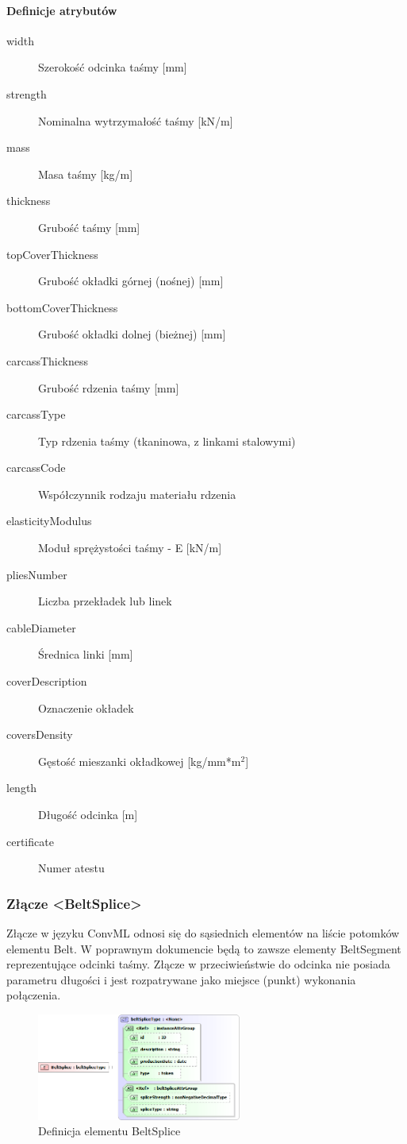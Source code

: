 \documentclass[12pt,a4paper]{article}
\begin{document}
\paragraph{Definicje atrybutów}
\begin{description}
\item[width] Szerokość odcinka taśmy [mm]
\item[strength] Nominalna wytrzymałość taśmy [kN/m]
\item[mass] Masa taśmy [kg/m]
\item[thickness] Grubość taśmy [mm]
\item[topCoverThickness] Grubość okładki górnej (nośnej) [mm]
\item[bottomCoverThickness] Grubość okładki dolnej (bieżnej) [mm]
\item[carcassThickness] Grubość rdzenia taśmy [mm]
\item[carcassType] Typ rdzenia taśmy (tkaninowa, z linkami stalowymi)
\item[carcassCode] Współczynnik rodzaju materiału rdzenia
\item[elasticityModulus] Moduł sprężystości taśmy - E [kN/m]
\item[pliesNumber] Liczba przekładek lub linek
\item[cableDiameter] Średnica linki [mm]
\item[coverDescription] Oznaczenie okładek
\item[coversDensity] Gęstość mieszanki okładkowej [kg/mm*m$^2$]
\item[length] Długość odcinka [m]
\item[certificate] Numer atestu
\end{description}


\subsubsection{Złącze <BeltSplice>}
Złącze w języku ConvML odnosi się do sąsiednich elementów na liście potomków
elementu Belt.  W poprawnym dokumencie będą to zawsze elementy BeltSegment
reprezentujące odcinki taśmy.  Złącze w przeciwieństwie do odcinka nie posiada
parametru długości i jest rozpatrywane jako miejsce (punkt) wykonania
połączenia.

\begin{figure}[H]
  \centering
  \includegraphics[width=0.6\textwidth]{png/belt_splice_xsd2}
  \caption{Definicja elementu BeltSplice}
  \label{fig:beltSplice-xsd}
\end{figure}
\end{document}
